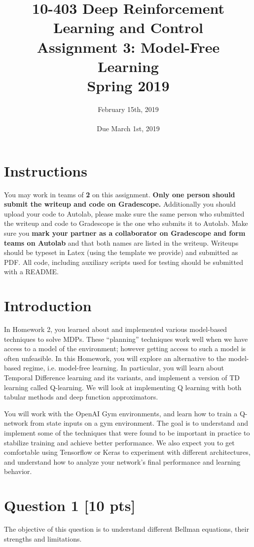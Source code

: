 \documentclass[12pt]{article}
\title{10-403 Deep Reinforcement Learning and Control\\
  Assignment 3: Model-Free Learning\\
  Spring 2019\\
}
\date{February 15th, 2019\\
  \hspace{1cm}\\
Due March 1st, 2019}
\begin{document}
\maketitle
\noindent
\section*{Instructions}

You may work in teams of \textbf{2} on this assignment. \textbf{Only one person should submit the writeup and code on Gradescope.} Additionally you should upload your code to Autolab, please make sure the same person who submitted the writeup and code to Gradescope is the one who submits it to Autolab.  Make sure you \textbf{mark your partner as a collaborator on Gradescope and form teams on Autolab} and that both names are listed in the writeup.  Writeups should be typeset in Latex (using the template we provide) and submitted as PDF. All code, including auxiliary scripts used for testing should be
submitted with a README.

\section*{Introduction}

In Homework 2, you learned about and implemented various model-based techniques to solve MDPs. These ``planning'' techniques work well when we have access to a model of the environment; however getting access to such a model is often unfeasible. In this Homework, you will explore an alternative to the model-based regime, i.e. model-free learning. 
In particular, you will learn about Temporal Difference learning and its variants, and implement a version of TD learning called Q-learning. We will look at implementing Q learning with both tabular methods and deep function approximators. 

You will work with the OpenAI Gym environments, and learn how to train a Q-network from state inputs on a gym environment. The goal is to understand and implement some of the techniques that were found to be important in practice to stabilize training and achieve better performance. We also expect you to get comfortable using Tensorflow or Keras to experiment with different architectures, and understand how to analyze your network's final performance and learning behavior. 


\section*{Question 1 \textbf{[10 pts]}}
The objective of this question is to understand different Bellman equations, their strengths and limitations.
\end{document}
